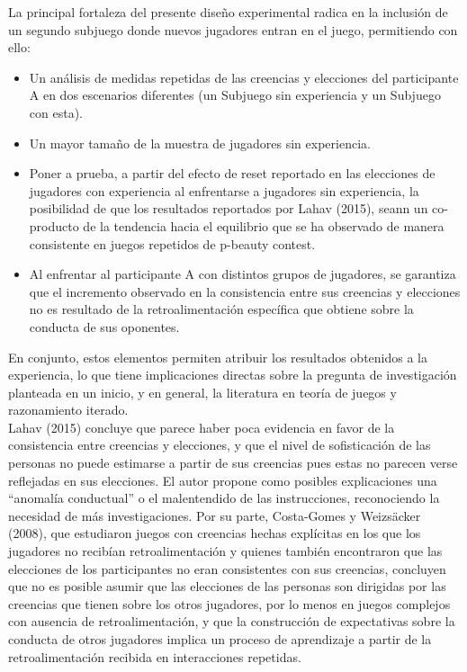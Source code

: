 La principal fortaleza del presente diseño experimental radica en la inclusión de un segundo subjuego donde nuevos jugadores entran en el juego, permitiendo con ello:\\

\begin{itemize}
\item Un análisis de medidas repetidas de las creencias y elecciones del participante A en dos escenarios diferentes (un Subjuego sin experiencia y un Subjuego con esta).\\

\item Un mayor tamaño de la muestra de jugadores sin experiencia.\\

\item Poner a prueba, a partir del efecto de reset reportado en las elecciones de jugadores con experiencia al enfrentarse a jugadores sin experiencia, la posibilidad de que los resultados reportados por Lahav (2015), seann un co-producto de la tendencia hacia el equilibrio que se ha observado de manera consistente en juegos repetidos de p-beauty contest.\\

\item Al enfrentar al participante A con distintos grupos de jugadores, se garantiza que el incremento observado en la consistencia entre sus creencias y elecciones no es resultado de la retroalimentación específica que obtiene sobre la conducta de sus oponentes.\\
\end{itemize}

En conjunto, estos elementos permiten atribuir los resultados obtenidos a la experiencia, lo que tiene implicaciones directas sobre la pregunta de investigación planteada en un inicio, y en general, la literatura en teoría de juegos y razonamiento iterado.\\

Lahav (2015) concluye que parece haber poca evidencia en favor de la consistencia entre creencias y elecciones, y que el nivel de sofisticación de las personas no puede estimarse a partir de sus creencias pues estas no parecen verse reflejadas en sus elecciones. El autor propone como posibles explicaciones una “anomalía conductual” o el malentendido de las instrucciones, reconociendo la necesidad de más investigaciones. Por su parte, Costa-Gomes y Weizsäcker (2008), que estudiaron juegos con creencias hechas explícitas en los que los jugadores no recibían retroalimentación y quienes también encontraron que las elecciones de los participantes no eran consistentes con sus creencias, concluyen que no es posible asumir que las elecciones de las personas son dirigidas por las creencias que tienen sobre los otros jugadores, por lo menos en juegos complejos con ausencia de retroalimentación, y que la construcción de expectativas sobre la conducta de otros jugadores implica un proceso de aprendizaje a partir de la retroalimentación recibida en interacciones repetidas.\\


